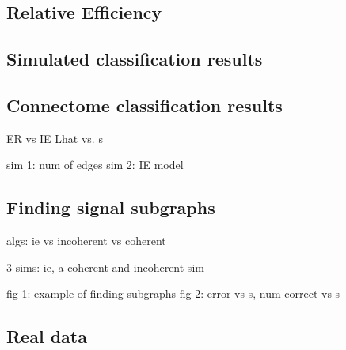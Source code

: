\documentclass[10pt,journal,cspaper,compsoc]{IEEEtran}
\begin{document}



\subsection{Relative Efficiency} %
\label{ssub:relative_efficiency}





\subsection{Simulated classification results} %
\label{sub:classification_results}



\subsection{Connectome classification results} %
\label{sub:connectome_classification_results}












ER vs IE
Lhat vs. s

sim 1: num of edges
sim 2: IE model



\subsection{Finding signal subgraphs} %
\label{sub:finding_signal_subgraphs}

algs: ie vs incoherent vs coherent

3 sims: ie, a coherent and incoherent sim

fig 1: example of finding subgraphs
fig 2: error vs s, num correct vs s






\subsection{Real data} %
\label{sub:real_data}
\end{document}
